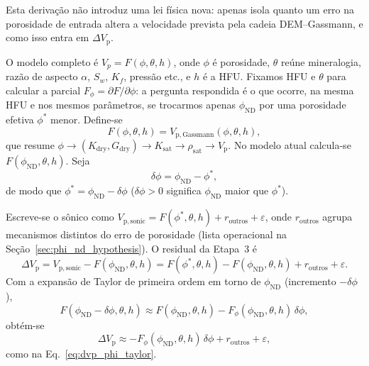 \documentclass[11pt,a4paper]{article}
\numberwithin{equation}{section}
\newcommand{\phiND}{\ensuremath{\phi_{\mathrm{ND}}}}
\begin{document}
Esta derivação não introduz uma lei física nova: apenas isola quanto um
erro na porosidade de entrada altera a velocidade prevista pela cadeia
DEM--Gassmann, e como isso entra em $\Delta V_{\mathrm{p}}$.

O modelo completo é $V_p=F(\phi,\theta,h)$, onde $\phi$ é porosidade,
$\theta$ reúne mineralogia, razão de aspecto $\alpha$, $S_w$, $K_f$,
pressão etc., e $h$ é a HFU.
Fixamos HFU e $\theta$ para calcular a parcial
$F_\phi=\partial F/\partial\phi$: a pergunta respondida é o que ocorre,
na mesma HFU e nos mesmos parâmetros, se trocarmos apenas \phiND{} por
uma porosidade efetiva $\phi^{*}$ menor.
Define-se
\begin{equation}
  F(\phi,\theta,h) = V_{\mathrm{p,Gassmann}}(\phi,\theta,h),
\end{equation}
que resume $\phi \rightarrow (K_{\mathrm{dry}},G_{\mathrm{dry}})
\rightarrow K_{\mathrm{sat}} \rightarrow \rho_{\mathrm{sat}}
\rightarrow V_{\mathrm{p}}$.
No modelo atual calcula-se $F(\phiND{},\theta,h)$.
Seja
\begin{equation}
  \delta\phi = \phiND{} - \phi^{*},
\end{equation}
de modo que $\phi^{*} = \phiND{} - \delta\phi$
($\delta\phi>0$ significa \phiND{} maior que $\phi^{*}$).

Escreve-se o sônico como
$V_{\mathrm{p,sonic}} = F(\phi^{*},\theta,h) + r_{\mathrm{outros}} + \varepsilon$,
onde $r_{\mathrm{outros}}$ agrupa mecanismos distintos do erro de porosidade
(lista operacional na Seção~\ref{sec:phi_nd_hypothesis}).
O residual da Etapa~3 é
\begin{equation}
  \Delta V_{\mathrm{p}}
  = V_{\mathrm{p,sonic}} - F(\phiND{},\theta,h)
  = F(\phi^{*},\theta,h) - F(\phiND{},\theta,h)
  + r_{\mathrm{outros}} + \varepsilon.
\end{equation}
Com a expansão de Taylor de primeira ordem em torno de \phiND{}
(incremento $-\delta\phi$),
\begin{equation}
  F(\phiND{} - \delta\phi,\theta,h)
  \approx
  F(\phiND{},\theta,h) - F_\phi(\phiND{},\theta,h)\,\delta\phi,
\end{equation}
obtém-se
\begin{equation}
  \Delta V_{\mathrm{p}}
  \approx
  -F_\phi(\phiND{},\theta,h)\,\delta\phi
  + r_{\mathrm{outros}} + \varepsilon,
\end{equation}
como na Eq.~\eqref{eq:dvp_phi_taylor}.
\end{document}
